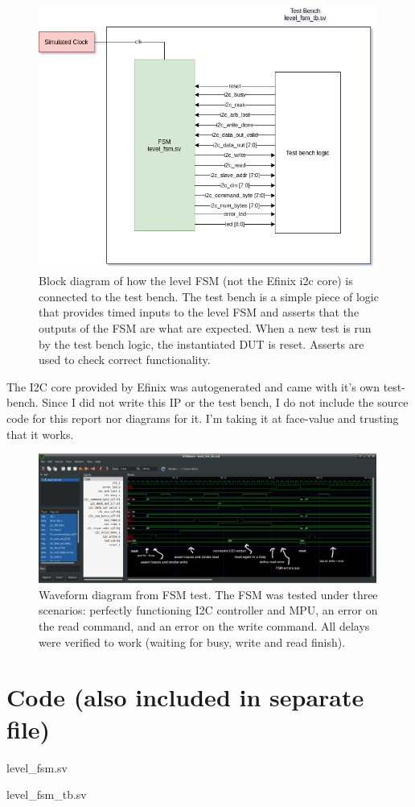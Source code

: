 \documentclass[11pt]{article}
\begin{document}
\begin{figure}[H]
    \centering
\includegraphics[width=0.99\textwidth]{tb.png}
    \caption{Block diagram of how the level FSM (not the Efinix i2c core) is connected to the test bench. The test bench is a simple piece of logic that provides timed inputs to the level FSM and asserts that the outputs of the FSM are what are expected. When a new test is run by the test bench logic, the instantiated DUT is reset. Asserts are used to check correct functionality. }
\end{figure}

The I2C core provided by Efinix was autogenerated and came with it's own test-bench. Since I did not write this IP or the test bench, I do not include the source code for this report nor diagrams for it. I'm taking it at face-value and trusting that it works.


\begin{figure}
    \centering
\includegraphics[width=0.99\textwidth]{waveform2.png}
    \caption{Waveform diagram from FSM test. The FSM was tested under three scenarios: perfectly functioning I2C controller and MPU, an error on the read command, and an error on the write command. All delays were verified to work (waiting for busy, write and read finish). }
\end{figure}

\pagebreak
\section{Code (also included in separate file)}
level{\_}fsm.sv

level{\_}fsm{\_}tb.sv

\end{document}
